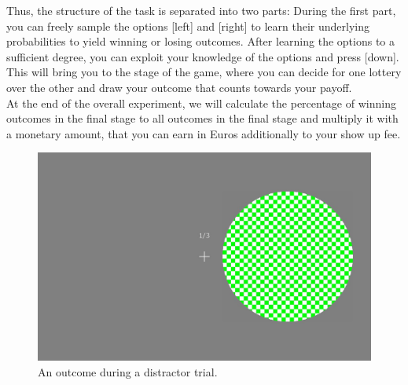 \documentclass[12pt, oneside]{scrartcl}
\begin{document}
Thus, the structure of the task is separated into two parts: During the first part, you can freely sample the options [left] and [right] to learn their underlying probabilities to yield winning or losing outcomes. After learning the options to a sufficient degree, you can exploit your knowledge of the options and press [down]. This will bring you to the stage of the game, where you can decide for one lottery over the other and draw your outcome that counts towards your payoff. \\

At the end of the overall experiment, we will calculate the percentage of winning outcomes in the final stage to all outcomes in the final stage and multiply it with a monetary amount, that you can earn in Euros additionally to your show up fee. \\

\begin{figure}[h!]
\begin{center}
\includegraphics[scale=0.3]{distr_right.jpg}
\caption{An outcome during a distractor trial.}
\label{distr_right}
\end{center}
\end{figure}
\end{document}
